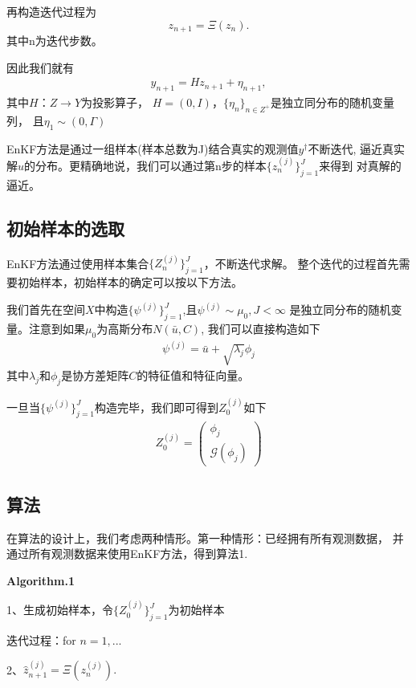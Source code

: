 \documentclass[a4paper,12pt,oneside,CJK]{cctbook}
\theoremstyle{definition}
\numberwithin{equation}{section}
\begin{document}
再构造迭代过程为
$$z_{n+1}=\Xi(z_n).$$
其中n为迭代步数。

因此我们就有
\begin{eqnarray*}
    y_{n+1}=Hz_{n+1}+\eta_{n+1},
\end{eqnarray*}
其中$H：Z\rightarrow Y$为投影算子，
$H=(0,I)$，$\{\eta_n\}_{n\in Z^+}$是独立同分布的随机变量列，
且$\eta_1\sim (0,\Gamma)$

EnKF方法是通过一组样本(样本总数为J)结合真实的观测值$y^{\dag}$不断迭代,
逼近真实解$u$的分布。更精确地说，我们可以通过第n步的样本$\{z_n^{(j)}\}_{j=1}^J$来得到
对真解的逼近。

\subsection{初始样本的选取}


EnKF方法通过使用样本集合$\{Z_n^{(j)}\}_{j=1}^J$，不断迭代求解。
整个迭代的过程首先需要初始样本，初始样本的确定可以按以下方法。

我们首先在空间$X$中构造$\{\psi^{(j)}\}_{j=1}^J$,且$\psi^{(j)}\sim \mu_0, J<\infty$
是独立同分布的随机变量。注意到如果$\mu_0$为高斯分布$N(\bar{u},C)$,
我们可以直接构造如下
\begin{eqnarray*}
   \psi^{(j)}=\bar{u}+\sqrt{\lambda_j} \phi_j
\end{eqnarray*}
其中$\lambda_j$和$\phi_j$是协方差矩阵$C$的特征值和特征向量。

一旦当$\{\psi^{(j)}\}_{j=1}^J$构造完毕，我们即可得到$Z_0^{(j)}$如下
\begin{eqnarray*}
    Z_0^{(j)}=
     \left(
    \begin{array}{ll}
      \phi_j  \\
      \mathcal{G}(\phi_j)
     \end{array}
     \right)
\end{eqnarray*}

\subsection{算法}

在算法的设计上，我们考虑两种情形。第一种情形：已经拥有所有观测数据，
并通过所有观测数据来使用EnKF方法，得到算法1.

\textbf{Algorithm.1}

1、生成初始样本，令$\{Z_0^{(j)}\}_{j=1}^J$为初始样本

迭代过程：for $n=1,...$

2、$\hat{z}_{n+1}^{(j)}=\Xi (z_{n}^{(j)}).$
\end{document}

